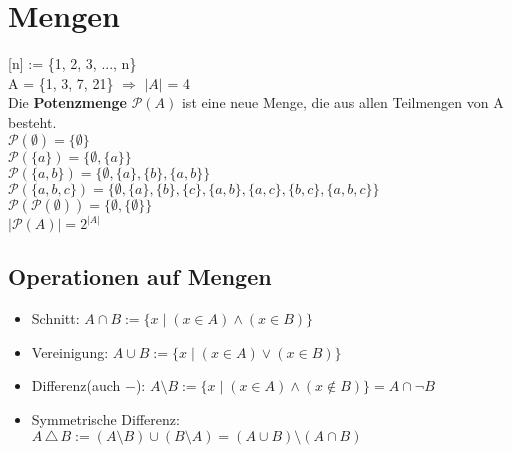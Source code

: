 \documentclass[11pt]{article}
\begin{document}
\section{Mengen}
{[}n{]} := \{1, 2, 3, ..., n\} \\
A = \{1, 3, 7, 21\} $\Rightarrow$ $\mathopen|A\mathclose|$ = 4 \\
Die {\bfseries Potenzmenge} $\mathcal P(A)$ ist eine neue Menge, die aus allen Teilmengen von A besteht. \\
$\mathcal P(\emptyset) = \{ \emptyset \}$ \\
$\mathcal P(\{ a \}) = \bigl\{ \emptyset, \{ a \} \bigr\}$ \\
$\mathcal P(\{ a, b \}) = \bigl\{ \emptyset, \{ a \}, \{ b \}, \{ a, b \} \bigr\}$ \\
$\mathcal P(\{ a, b, c \}) = \bigl\{ \emptyset, \{ a \}, \{ b \}, \{ c \}, \{ a, b \}, \{ a, c \}, \{ b, c \}, \{ a, b, c \} \bigr\}$ \\
$\mathcal P(\mathcal P(\emptyset)) = \bigl\{ \emptyset, \{\emptyset\}\bigr\}$ \\
$\mathopen|\mathcal P(A)\mathclose| = 2^{\mathopen|A\mathclose|}$ \\

\subsection{Operationen auf Mengen}
\begin{itemize}\itemsep0em\small
\item Schnitt: $A \cap B := \{ x \mid \left( x \in A \right) \land \left( x \in B \right) \}$
\item Vereinigung: $A \cup B := \{ x \mid \left( x \in {A} \right) \lor \left( x \in B \right) \}$
\item Differenz(auch $-$): $A \setminus B := \{ x \mid \left( x\in A \right) \land \left( x\not \in B \right) \} = A \cap \neg B$
\item Symmetrische Differenz: $A \, \triangle \, B := \left( A \setminus B \right) \cup \left( B \setminus A \right) = ( A \cup B) \setminus (A \cap B) $
\end{itemize}  \normalsize
\end{document}
